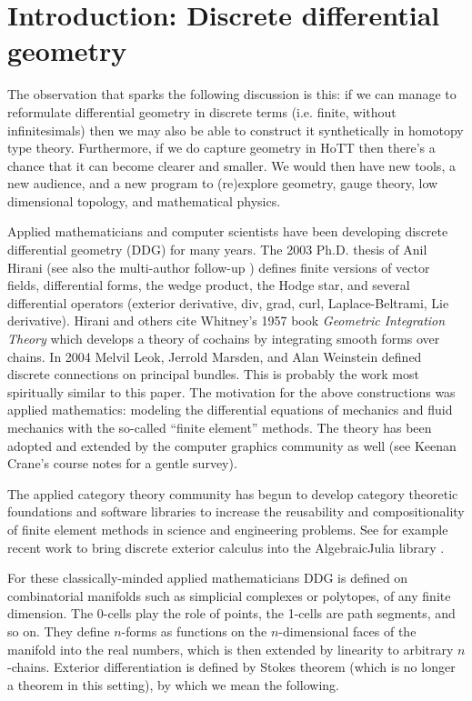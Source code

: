 \documentclass[12pt]{article}
\begin{document}
\section{Introduction: Discrete differential geometry}

The observation that sparks the following discussion is this: if we can manage to reformulate differential geometry in discrete terms (i.e. finite, without infinitesimals) then we may also be able to construct it synthetically in homotopy type theory. Furthermore, if we do capture geometry in HoTT then there's a chance that it can become clearer and smaller. We would then have new tools, a new audience, and a new program to (re)explore geometry, gauge theory, low dimensional topology, and mathematical physics.

Applied mathematicians and computer scientists have been developing discrete differential geometry (DDG) for many years. The 2003 Ph.D. thesis of Anil Hirani \cite{hiranidec} (see also the multi-author follow-up \cite{desbrundec}) defines finite versions of vector fields, differential forms, the wedge product, the Hodge star, and several differential operators (exterior derivative, div, grad, curl, Laplace-Beltrami, Lie derivative). Hirani and others cite Whitney's 1957 book \emph{Geometric Integration Theory}\cite{whitney1957} which develops a theory of cochains by integrating smooth forms over chains. In 2004 Melvil Leok, Jerrold Marsden, and Alan Weinstein \cite{leok} defined discrete connections on principal bundles. This is probably the work most spiritually similar to this paper. The motivation for the above constructions was applied mathematics: modeling the differential equations of mechanics and fluid mechanics with the so-called ``finite element'' methods. The theory has been adopted and extended by the computer graphics community as well (see Keenan Crane's course notes \cite{crane_ddg} for a gentle survey).

The applied category theory community has begun to develop category theoretic foundations and software libraries to increase the reusability and compositionality of finite element methods in science and engineering problems. See for example recent work to bring discrete exterior calculus into the AlgebraicJulia library \cite{morris_decapodes} \cite{patterson_diffeq}.

For these classically-minded applied mathematicians DDG is defined on combinatorial manifolds such as simplicial complexes or polytopes, of any finite dimension. The 0-cells play the role of points, the 1-cells are path segments, and so on. They define \( n \)-forms as functions on the \( n \)-dimensional faces of the manifold into the real numbers, which is then extended by linearity to arbitrary \( n \)-chains. Exterior differentiation is defined by Stokes theorem (which is no longer a theorem in this setting), by which we mean the following. 
\end{document}
